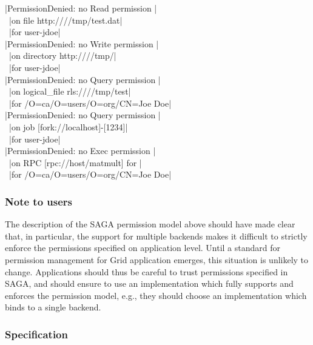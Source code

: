   \shift |PermissionDenied: no Read permission |\\
  \shift\shift\shift\shift\, |on file http:////tmp/test.dat|\\
  \shift\shift\shift\shift\, |for user-jdoe|\\[1em]
  \shift |PermissionDenied: no Write permission |\\
  \shift\shift\shift\shift\, |on directory http:////tmp/|\\
  \shift\shift\shift\shift\, |for user-jdoe|\\[1em]
  \shift |PermissionDenied: no Query permission |\\
  \shift\shift\shift\shift\, |on logical_file rls:////tmp/test|\\
  \shift\shift\shift\shift\, |for /O=ca/O=users/O=org/CN=Joe Doe|\\[1em]
  \shift |PermissionDenied: no Query permission |\\
  \shift\shift\shift\shift\, |on job [fork://localhost]-[1234]|\\
  \shift\shift\shift\shift\, |for user-jdoe|\\[1em]
  \shift |PermissionDenied: no Exec permission |\\
  \shift\shift\shift\shift\, |on RPC [rpc://host/matmult] for |\\
  \shift\shift\shift\shift\, |for /O=ca/O=users/O=org/CN=Joe Doe|
 
 \subsubsection*{Note to users}
 
  The description of the SAGA permission model above should have
  made clear that, in particular, the support for multiple
  backends makes it difficult to strictly enforce the
  permissions specified on application level.  Until a standard
  for permission management for Grid application emerges, this
  situation is unlikely to change.  Applications should thus be
  careful to trust permissions specified in SAGA, and should
  ensure to use an implementation which fully supports and
  enforces the permission model, e.g., they should choose an
  implementation which binds to a single backend.
 
 \subsubsection{Specification}
 
